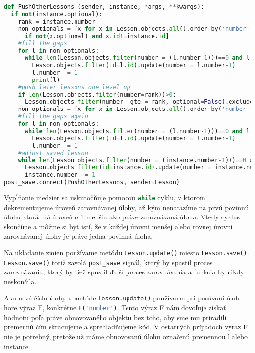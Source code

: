 \begin{lstlisting}[language=Python, title = Posúvanie úloh]
def PushOtherLessons (sender, instance, *args, **kwargs):
  if not(instance.optional):
    rank = instance.number
    non_optionals = [x for x in Lesson.objects.all().order_by('number')
      if not(x.optional) and x.id!=instance.id]
    #fill the gaps
    for l in non_optionals:
      while len(Lesson.objects.filter(number = (l.number-1)))==0 and l.number>1:
        Lesson.objects.filter(id=l.id).update(number = l.number-1)
        l.number -= 1
        print(l)
    #push later lessons one level up
    if len(Lesson.objects.filter(number=rank))>0:
      Lesson.objects.filter(number__gte = rank, optional=False).exclude(id=instance.id).update(number = F('number')+1)
    non_optionals = [x for x in Lesson.objects.all().order_by('number') if not(x.optional) and x.id!=instance.id]
    #fill the gaps again
    for l in non_optionals:
      while len(Lesson.objects.filter(number = (l.number-1)))==0 and l.number>1:
        Lesson.objects.filter(id=l.id).update(number = l.number-1)
        l.number -= 1
    #adjust saved lesson
    while len(Lesson.objects.filter(number = (instance.number-1)))==0 and instance.number>1:
      Lesson.objects.filter(id=instance.id).update(number = instance.number-1)
      instance.number -= 1
post_save.connect(PushOtherLessons, sender=Lesson)
\end{lstlisting}

Vypĺňanie medzier sa uskutočňuje pomocou \lstinline[language=Python]{while} cyklu,
v ktorom dekrementujeme úroveň zarovnávanej úlohy, až kým nenarazíme na prvú povinnú úlohu ktorá má
úroveň o 1 menšiu ako práve zarovnávaná úloha. Vtedy cyklus skončíme a môžme si byť istí,
že v každej úrovni menšej alebo rovnej úrovni zarovnávanej úlohy je práve jedna povinná úloha.

Na ukladanie zmien používame metódu \lstinline[language=Python]{Lesson.update()} miesto
\lstinline[language=Python]{Lesson.save()}. \lstinline[language=Python]{Lesson.save()} totiž zavolá
\lstinline[language=Python]{post_save} signál, ktorý by spustil proces zarovnávania, ktorý by tiež
spustil ďalší proces zarovnávania a funkcia by nikdy neskončila.

Ako nové číslo úlohy v metóde \lstinline[language=Python]{Lesson.update()} používame pri posúvaní úloh hore výraz F,
konkrétne \lstinline[language=Python]{F('number')}. Tento výraz F nám dovoľuje získať hodnotu
poľa práve obnovovaného objektu bez toho, aby sme mu priradili premennú čím skracujeme
a sprehľadňujeme kód. V ostatných prípadoch výraz F nie je potrebný, pretože už máme
obnovovanú úlohu označenú premennou l alebo instance.
